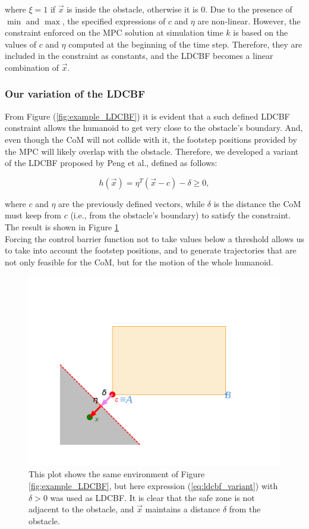 where $\xi=1$ if $\vec{x}$ is inside the obstacle, otherwise it is $0$.
Due to the presence of $\min$ and $\max$, the specified expressions of $c$ and $\eta$ are non-linear. However, the constraint enforced on the MPC solution at simulation time $k$ is based on the values of $c$ and $\eta$ computed at the beginning of the time step. Therefore, they are included in the constraint as constants, and the LDCBF becomes a linear combination of $\vec{x}$.

\subsubsection{Our variation of the LDCBF}\label{subsec:ldcbf_variant}
From Figure (\ref{fig:example_LDCBF}) it is evident that a such defined LDCBF constraint allows the humanoid to get very close to the obstacle's boundary. And, even though the CoM will not collide with it, the footstep positions provided by the MPC will likely overlap with the obstacle. Therefore, we developed a variant of the LDCBF proposed by Peng et al., defined as follows:

\begin{equation} \label{eq:ldcbf_variant}
h\left(\vec{x}\right) = \eta^T \left(\vec{x} - c\right) - \delta \geq 0,
\end{equation}

where $c$ and $\eta$ are the previously defined vectors, while $\delta$ is the distance the CoM must keep from $c$ (i.e., from the obstacle's boundary) to satisfy the constraint. The result is shown in Figure \ref{fig:example_LDCBF_variant}\\
Forcing the control barrier function not to take values below a threshold allows us to take into account the footstep positions, and to generate trajectories that are not only feasible for the CoM, but for the motion of the whole humanoid.

\begin{figure}[h]
    \centering
    \includegraphics[width=0.75\linewidth]{figures//MPC/example_lcbf_variant2.pdf}
    \caption{This plot shows the same environment of Figure \ref{fig:example_LDCBF}, but here expression (\ref{eq:ldcbf_variant}) with $\delta > 0$ was used as LDCBF. It is clear that the safe zone is not adjacent to the obstacle, and $\vec{x}$ maintains a distance $\delta$ from the obstacle.}
    \label{fig:example_LDCBF_variant}
\end{figure}
